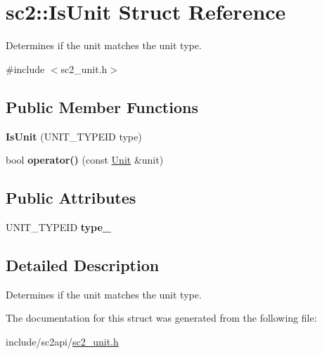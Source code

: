 \hypertarget{structsc2_1_1_is_unit}{}\section{sc2\+:\+:Is\+Unit Struct Reference}
\label{structsc2_1_1_is_unit}


Determines if the unit matches the unit type.  




{\ttfamily \#include $<$sc2\+\_\+unit.\+h$>$}

\subsection*{Public Member Functions}
\begin{DoxyCompactItemize}
\item 
\mbox{\label{structsc2_1_1_is_unit_ac2017bcac8de9e3d3c70a80ecb00503a}} 
{\bfseries Is\+Unit} (U\+N\+I\+T\+\_\+\+T\+Y\+P\+E\+ID type)
\item 
\mbox{\label{structsc2_1_1_is_unit_abcba145d52a6ade952ac443a0957dae3}} 
bool {\bfseries operator()} (const \hyperlink{classsc2_1_1_unit}{Unit} \&unit)
\end{DoxyCompactItemize}
\subsection*{Public Attributes}
\begin{DoxyCompactItemize}
\item 
\mbox{\label{structsc2_1_1_is_unit_abf70a6314708ccc3266c65a69dfd24fb}} 
U\+N\+I\+T\+\_\+\+T\+Y\+P\+E\+ID {\bfseries type\+\_\+}
\end{DoxyCompactItemize}


\subsection{Detailed Description}
Determines if the unit matches the unit type. 

The documentation for this struct was generated from the following file\+:\begin{DoxyCompactItemize}
\item 
include/sc2api/\hyperlink{sc2__unit_8h}{sc2\+\_\+unit.\+h}\end{DoxyCompactItemize}
